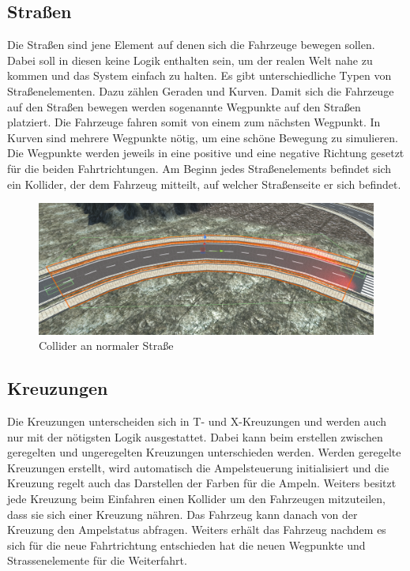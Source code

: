 \subsection{Straßen}
\label{sub:street}

Die Straßen sind jene Element auf denen sich die Fahrzeuge bewegen sollen. Dabei soll in diesen keine Logik enthalten sein, um der realen Welt nahe zu kommen und das System einfach zu halten. Es gibt unterschiedliche Typen von Straßenelementen. Dazu zählen Geraden und Kurven. Damit sich die Fahrzeuge auf den Straßen bewegen werden sogenannte Wegpunkte auf den Straßen platziert. Die Fahrzeuge fahren somit von einem zum nächsten Wegpunkt. In Kurven sind mehrere Wegpunkte nötig, um eine schöne Bewegung zu simulieren. Die Wegpunkte werden jeweils in eine positive und eine negative Richtung gesetzt für die beiden Fahrtrichtungen. Am Beginn jedes Straßenelements befindet sich ein Kollider, der dem Fahrzeug mitteilt, auf welcher Straßenseite er sich befindet.

\begin{figure}[H]
\begin{center}
	\includegraphics[width=1\textwidth]{BilderAllgemein/street_collider.PNG}
\end{center}
	\caption{Collider an normaler Straße}
	\label{img:street_collider}
\end{figure}

\subsection{Kreuzungen}

Die Kreuzungen unterscheiden sich in T- und X-Kreuzungen und werden auch nur mit der nötigsten Logik ausgestattet. Dabei kann beim erstellen zwischen geregelten und ungeregelten Kreuzungen unterschieden werden. Werden geregelte Kreuzungen erstellt, wird automatisch die Ampelsteuerung initialisiert und die Kreuzung regelt auch das Darstellen der Farben für die Ampeln. Weiters besitzt jede Kreuzung beim Einfahren einen Kollider um den Fahrzeugen mitzuteilen, dass sie sich einer Kreuzung nähren. Das Fahrzeug kann danach von der Kreuzung den Ampelstatus abfragen. Weiters erhält das Fahrzeug nachdem es sich für die neue Fahrtrichtung entschieden hat die neuen Wegpunkte und Strassenelemente für die Weiterfahrt.

